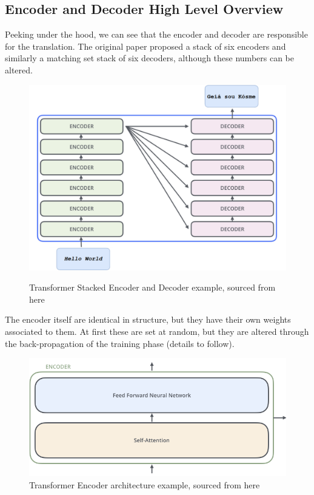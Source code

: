 \subsection{Encoder and Decoder High Level Overview}
Peeking under the hood, we can see that the encoder and decoder are responsible for the translation. The original paper proposed a stack of
six encoders and similarly a matching set stack of six decoders, although these numbers can be altered.
\begin{figure}[H]
	\centering
	\includegraphics[width=0.9\linewidth]{figures/transformer_stacked_encoder_decoder.png}
	\label{fig:transformer_stacked_encoder_decoder}
	\caption{Transformer Stacked Encoder and Decoder example, sourced from here~\autocite{alammarIllustratedTransformer}}
\end{figure}
The encoder itself are identical in structure, but they have their own weights associated to them. At first these are set at random, but they are
altered through the back-propagation of the training phase (details to follow).
\begin{figure}[H]
	\centering
	\includegraphics[width=0.8\linewidth]{figures/encoder_architecture.png}
	\caption{Transformer Encoder architecture example, sourced from here~\autocite{alammarIllustratedTransformer}}
	\label{fig:transformer_encoder}
\end{figure}

